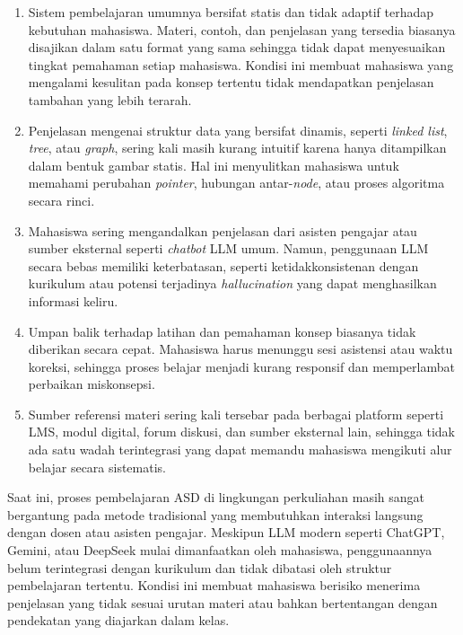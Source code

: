 \begin{enumerate}
    \item Sistem pembelajaran umumnya bersifat statis dan tidak adaptif terhadap kebutuhan mahasiswa. Materi, contoh, dan penjelasan yang tersedia biasanya disajikan dalam satu format yang sama sehingga tidak dapat menyesuaikan tingkat pemahaman setiap mahasiswa. Kondisi ini membuat mahasiswa yang mengalami kesulitan pada konsep tertentu tidak mendapatkan penjelasan tambahan yang lebih terarah.

    \item Penjelasan mengenai struktur data yang bersifat dinamis, seperti \textit{linked list}, \textit{tree}, atau \textit{graph}, sering kali masih kurang intuitif karena hanya ditampilkan dalam bentuk gambar statis. Hal ini menyulitkan mahasiswa untuk memahami perubahan \textit{pointer}, hubungan antar-\textit{node}, atau proses algoritma secara rinci.

    \item Mahasiswa sering mengandalkan penjelasan dari asisten pengajar atau sumber eksternal seperti \textit{chatbot} LLM umum. Namun, penggunaan LLM secara bebas memiliki keterbatasan, seperti ketidakkonsistenan dengan kurikulum atau potensi terjadinya \textit{hallucination} yang dapat menghasilkan informasi keliru.

    \item Umpan balik terhadap latihan dan pemahaman konsep biasanya tidak diberikan secara cepat. Mahasiswa harus menunggu sesi asistensi atau waktu koreksi, sehingga proses belajar menjadi kurang responsif dan memperlambat perbaikan miskonsepsi.

    \item Sumber referensi materi sering kali tersebar pada berbagai platform seperti LMS, modul digital, forum diskusi, dan sumber eksternal lain, sehingga tidak ada satu wadah terintegrasi yang dapat memandu mahasiswa mengikuti alur belajar secara sistematis.
\end{enumerate}

Saat ini, proses pembelajaran ASD di lingkungan perkuliahan masih sangat bergantung pada metode tradisional yang membutuhkan interaksi langsung dengan dosen atau asisten pengajar. Meskipun LLM modern seperti ChatGPT, Gemini, atau DeepSeek mulai dimanfaatkan oleh mahasiswa, penggunaannya belum terintegrasi dengan kurikulum dan tidak dibatasi oleh struktur pembelajaran tertentu. Kondisi ini membuat mahasiswa berisiko menerima penjelasan yang tidak sesuai urutan materi atau bahkan bertentangan dengan pendekatan yang diajarkan dalam kelas.



